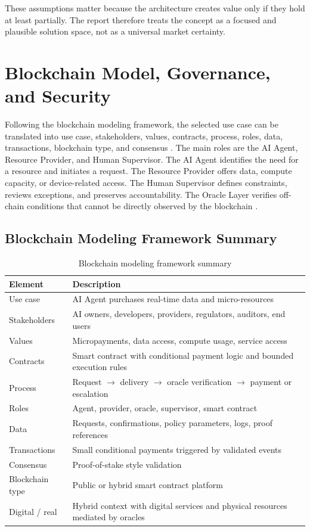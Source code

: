 \documentclass[12pt,a4paper,oneside]{article}
\theoremstyle{definition}
\theoremstyle{plain}
\begin{document}
These assumptions matter because the architecture creates value only if they hold at least partially. The report therefore treats the concept as a focused and plausible solution space, not as a universal market certainty.

\section{Blockchain Model, Governance, and Security}

Following the blockchain modeling framework, the selected use case can be translated into use case, stakeholders, values, contracts, process, roles, data, transactions, blockchain type, and consensus \citep{krueger2026workshop7a,krueger2026workshop7b}. The main roles are the AI Agent, Resource Provider, and Human Supervisor. The AI Agent identifies the need for a resource and initiates a request. The Resource Provider offers data, compute capacity, or device-related access. The Human Supervisor defines constraints, reviews exceptions, and preserves accountability. The Oracle Layer verifies off-chain conditions that cannot be directly observed by the blockchain \citep{krueger2026oracles}.

\subsection{Blockchain Modeling Framework Summary}

\begin{table}[H]
\centering
\caption{Blockchain modeling framework summary}
\label{tab:modelsummary}
\begin{tabular}{p{4.0cm}p{9.0cm}}
\toprule
\textbf{Element} & \textbf{Description} \\
\midrule
Use case & AI Agent purchases real-time data and micro-resources \\
Stakeholders & AI owners, developers, providers, regulators, auditors, end users \\
Values & Micropayments, data access, compute usage, service access \\
Contracts & Smart contract with conditional payment logic and bounded execution rules \\
Process & Request $\rightarrow$ delivery $\rightarrow$ oracle verification $\rightarrow$ payment or escalation \\
Roles & Agent, provider, oracle, supervisor, smart contract \\
Data & Requests, confirmations, policy parameters, logs, proof references \\
Transactions & Small conditional payments triggered by validated events \\
Consensus & Proof-of-stake style validation \\
Blockchain type & Public or hybrid smart contract platform \\
Digital / real & Hybrid context with digital services and physical resources mediated by oracles \\
\bottomrule
\end{tabular}
\end{table}
\end{document}
